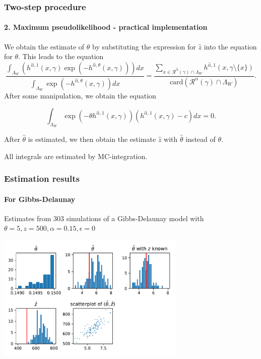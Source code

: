 \documentclass[c, 10pt]{beamer}
\begin{document}
\begin{frame}\frametitle{Two-step procedure}\framesubtitle{2. Maximum pseudolikelihood - practical implementation}
\begin{small}
We obtain the estimate of $\theta$ by substituting the expression for $\hat z$ into the equation for $\theta$. 
This leads to the equation
$$ 
\frac{\int_{\Lambda_W } (h^{\hat\alpha,1}(x,\gamma)\exp{\left(-h^{\hat\alpha,\theta}(x,\gamma)\right)}) dx} {  \int_{\Lambda_W } \exp{\left( -h^{\hat\alpha,\theta}(x,\gamma)\right)} dx} 
= \frac {\sum_{x \in \mathcal R^{\hat\alpha}(\gamma)\cap \Lambda_W } h^{\hat\alpha,1}(x,\gamma\setminus\{x\})} { \mbox{card}(\mathcal R^\alpha(\gamma)\cap \Lambda_W ) }. 
$$
After some manipulation, we obtain the equation

$$\int_{\Lambda_W} \exp{\left(-\theta h^{\hat\alpha, 1}(x,\gamma)\right)} (h^{\hat\alpha, 1}(x,\gamma) - c) dx = 0 .$$

After $\hat\theta$ is estimated, we then obtain the estimate $\hat z$ with $\hat\theta$ instead of $\theta$.

All integrals are estimated by MC-integration.
\end{small}
\end{frame}


\begin{frame}\frametitle{Estimation results}\framesubtitle{For Gibbs-Delaunay}
Estimates from $303$ simulations of a Gibbs-Delaunay model with $\theta = 5, z = 500, \alpha = 0.15, \epsilon = 0$

\begin{center}
\includegraphics[height = 6cm]{./FigureLayout/estimates_delaunay.pdf}
\end{center}

\end{frame}
\end{document}
